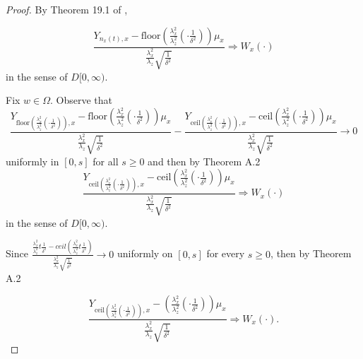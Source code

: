 \documentclass{wscpaperproc}
\theoremstyle{wsc}
\begin{document}
\begin{proof}
By Theorem 19.1 of  ,

\[
\frac{Y_{n_{x}\left(t\right),x}-\mbox{floor}\left(\frac{\lambda_{x}^{2}}{\lambda_{z}^{2}}\left(\cdot\frac{1}{\delta^{2}}\right)\right)\mu_{x}}{\frac{\lambda_{x}^{2}}{\lambda_{z}}\sqrt{\frac{1}{\delta^{2}}}}\Rightarrow W_{x}\left(\cdot\right)
\]
in the sense of $D[0,\infty)$. 

Fix $w\in\Omega$. Observe that
\[
\frac{Y_{\mbox{floor}\left(\frac{\lambda_{x}^{2}}{\lambda_{z}^{2}}\left(\cdot\frac{1}{\delta^{2}}\right)\right),x}-\mbox{floor}\left(\frac{\lambda_{x}^{2}}{\lambda_{z}^{2}}\left(\cdot\frac{1}{\delta^{2}}\right)\right)\mu_{x}}{\frac{\lambda_{x}^{2}}{\lambda_{z}}\sqrt{\frac{1}{\delta^{2}}}}-\frac{Y_{\mbox{ceil}\left(\frac{\lambda_{x}^{2}}{\lambda_{z}^{2}}\left(\cdot\frac{1}{\delta^{2}}\right)\right),x}-\mbox{ceil}\left(\frac{\lambda_{x}^{2}}{\lambda_{z}^{2}}\left(\cdot\frac{1}{\delta^{2}}\right)\right)\mu_{x}}{\frac{\lambda_{x}^{2}}{\lambda_{z}}\sqrt{\frac{1}{\delta^{2}}}}\rightarrow0
\]
uniformly in $\left[0,s\right]$ for all $s\geq0$ and then by Theorem
A.2 
\[
\frac{Y_{\mbox{ceil}\left(\frac{\lambda_{x}^{2}}{\lambda_{z}^{2}}\left(\cdot\frac{1}{\delta^{2}}\right)\right),x}-\mbox{ceil}\left(\frac{\lambda_{x}^{2}}{\lambda_{z}^{2}}\left(\cdot\frac{1}{\delta^{2}}\right)\right)\mu_{x}}{\frac{\lambda_{x}^{2}}{\lambda_{z}}\sqrt{\frac{1}{\delta^{2}}}}\Rightarrow W_{x}\left(\cdot\right)
\]
in the sense of $D[0,\infty)$. 

Since $\frac{\frac{\lambda_{x}^{2}}{\lambda_{z}^{2}}t\frac{1}{\delta^{2}}-ceil\left(\frac{\lambda_{x}^{2}}{\lambda_{z}^{2}}t\frac{1}{\delta^{2}}\right)}{\frac{\lambda_{x}^{2}}{\lambda_{z}}\sqrt{\frac{1}{\delta^{2}}}}\rightarrow0$
uniformly on $[0,s]$ for every $s\geq0$, then by Theorem A.2

\[
\frac{Y_{\mbox{ceil}\left(\frac{\lambda_{x}^{2}}{\lambda_{z}^{2}}\left(\cdot\frac{1}{\delta^{2}}\right)\right),x}-\mbox{}\left(\frac{\lambda_{x}^{2}}{\lambda_{z}^{2}}\left(\cdot\frac{1}{\delta^{2}}\right)\right)\mu_{x}}{\frac{\lambda_{x}^{2}}{\lambda_{z}}\sqrt{\frac{1}{\delta^{2}}}}\Rightarrow W_{x}\left(\cdot\right).
\]



\end{proof}
\end{document}
